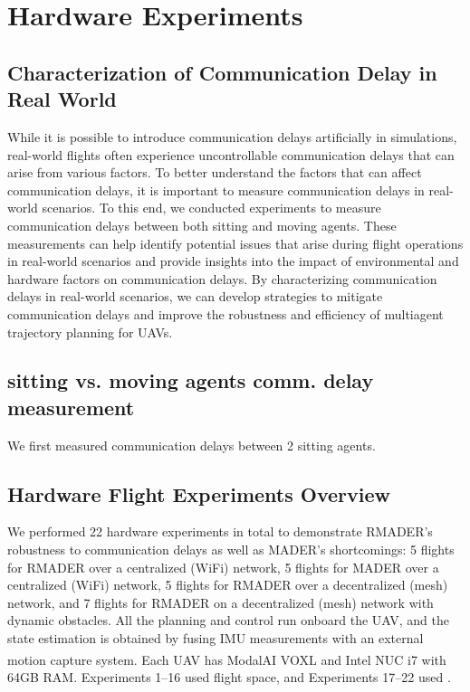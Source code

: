 \section{Hardware Experiments}\label{sec:rmader-hardware-experiments}

\subsection{Characterization of Communication Delay in Real World}

While it is possible to introduce communication delays artificially in simulations, real-world flights often experience uncontrollable communication delays that can arise from various factors. To better understand the factors that can affect communication delays, it is important to measure communication delays in real-world scenarios. To this end, we conducted experiments to measure communication delays between both sitting and moving agents. These measurements can help identify potential issues that arise during flight operations in real-world scenarios and provide insights into the impact of environmental and hardware factors on communication delays. By characterizing communication delays in real-world scenarios, we can develop strategies to mitigate communication delays and improve the robustness and efficiency of multiagent trajectory planning for UAVs.

\subsection{sitting vs. moving agents comm. delay measurement}

We first measured communication delays between 2 sitting agents. 


\subsection{Hardware Flight Experiments Overview}

We performed 22 hardware experiments in total to demonstrate RMADER's robustness to communication delays as well as MADER's shortcomings: 5 flights for RMADER over a centralized (WiFi) network, 5 flights for MADER over a centralized (WiFi) network, 5 flights for RMADER over a decentralized (mesh) network, and 7 flights for RMADER on a decentralized (mesh) network with dynamic obstacles.
All the planning and control run onboard the UAV, and the state estimation is obtained by fusing IMU measurements with an external motion capture system.
Each UAV has ModalAI\textsuperscript{\textregistered} VOXL\textsuperscript{\textregistered} and Intel\textsuperscript{\textregistered} NUC i7 with 64GB RAM.
Experiments 1--16 used  flight space, and Experiments 17--22 used .

